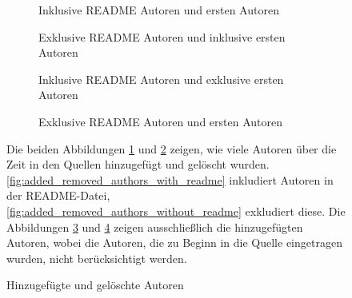 \begin{figure}
    \begin{subfigure}{.5\textwidth}
        \centering
        
        \caption{Inklusive README Autoren und ersten Autoren}
        \label{fig:added_removed_authors_with_readme}
    \end{subfigure}%
    \begin{subfigure}{.5\textwidth}
        \centering
        
        \caption{Exklusive README Autoren und inklusive ersten Autoren}
        \label{fig:added_removed_authors_without_readme}
    \end{subfigure}
    \begin{subfigure}{.5\textwidth}
        \centering
        
        \caption{Inklusive README Autoren und exklusive ersten Autoren}
        \label{fig:added_authors_without_first_timestamp}
    \end{subfigure}%
    \begin{subfigure}{.5\textwidth}
        \centering
        
        \caption{Exklusive README Autoren und ersten Autoren}
        \label{fig:added_authors_without_readme_without_first_timestamp}
    \end{subfigure}
    \caption{Hinzugefügte und gelöschte Autoren}
    \label{fig:added_removed_authors}
    \small
    Die beiden Abbildungen \ref{fig:added_removed_authors_with_readme} und \ref{fig:added_removed_authors_without_readme} zeigen, wie viele Autoren über die Zeit in den Quellen hinzugefügt und gelöscht wurden. \autoref{fig:added_removed_authors_with_readme} inkludiert Autoren in der README-Datei, \autoref{fig:added_removed_authors_without_readme} exkludiert diese. Die Abbildungen \ref{fig:added_authors_without_first_timestamp} und \ref{fig:added_authors_without_readme_without_first_timestamp} zeigen ausschließlich die hinzugefügten Autoren, wobei die Autoren, die zu Beginn in die Quelle eingetragen wurden, nicht berücksichtigt werden.
\end{figure}

